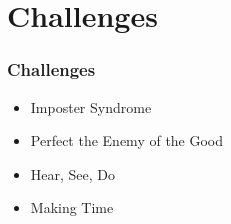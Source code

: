 \section{Challenges}

\begin{frame}[t]
	\frametitle{Challenges}
	\Large
	
	\begin{itemize}
		\item Imposter Syndrome
		\item Perfect the Enemy of the Good
		\item Hear, See, Do
		\item Making Time		
	\end{itemize}
	
\end{frame}

